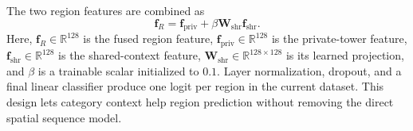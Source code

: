 The two region features are combined as
\begin{equation}
    \mathbf{f}_{R}
    =\mathbf{f}_{\mathrm{priv}}
    +\beta\mathbf{W}_{\mathrm{shr}}\mathbf{f}_{\mathrm{shr}}.
    \label{eq:apx-region-fusion}
\end{equation}
Here, $\mathbf{f}_{R}\in\mathbb{R}^{128}$ is the fused region feature,
$\mathbf{f}_{\mathrm{priv}}\in\mathbb{R}^{128}$ is the private-tower feature,
$\mathbf{f}_{\mathrm{shr}}\in\mathbb{R}^{128}$ is the shared-context feature,
$\mathbf{W}_{\mathrm{shr}}\in\mathbb{R}^{128\times128}$ is its learned projection,
and $\beta$ is a trainable scalar initialized to $0.1$. Layer normalization,
dropout, and a final linear classifier produce one logit per region in the current
dataset. This design lets category context help region prediction without removing
the direct spatial sequence model.

